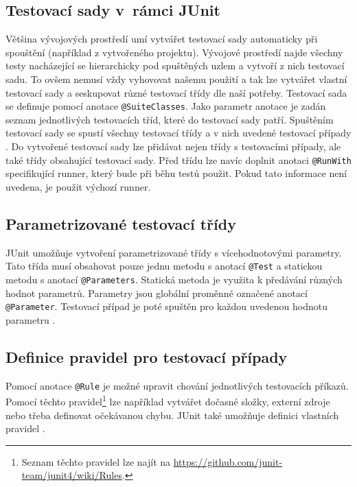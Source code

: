     \subsection{Testovací sady v~rámci JUnit}
    Většina vývojových prostředí umí vytvářet testovací sady automaticky při spouštění (například z vytvořeného projektu). Vývojové prostředí najde všechny testy nacházející se hierarchicky pod spuštěných uzlem a vytvoří z nich testovací sadu. To ovšem nemusí vždy vyhovovat našemu použití a tak lze vytvářet vlastní testovací sady a seskupovat různé testovací třídy dle naší potřeby. Testovací sada se definuje pomocí anotace \texttt{@SuiteClasses}. Jako parametr anotace je zadán seznam jednotlivých testovacích tříd, které do testovací sady patří. Spuštěním testovací sady se spustí všechny testovací třídy a v nich uvedené testovací případy \cite{vogella:JUnit}. Do vytvořené testovací sady lze přidávat nejen třídy s testovacími případy, ale také třídy obsahující testovací sady. Před třídu lze navíc doplnit anotaci \texttt{@RunWith} specifikující runner, který bude při běhu testů použit. Pokud tato informace není uvedena, je použit výchozí runner.

    \subsection{Parametrizované testovací třídy}
    JUnit umožňuje vytvoření parametrizované třídy s vícehodnotovými parametry. Tato třída musí obsahovat pouze jednu metodu s anotací \texttt{@Test} a statickou metodu s anotací \texttt{@Parameters}. Statická metoda je využita k předávání různých hodnot parametrů. Parametry jsou globální proměnné označené anotací \texttt{@Parameter}. Testovací případ je poté spuštěn pro každou uvedenou hodnotu parametru \cite{vogella:JUnit}.

    \subsection{Definice pravidel pro testovací případy}
    Pomocí anotace \texttt{@Rule} je možné upravit chování jednotlivých testovacích příkazů. Pomocí těchto pravidel\footnote{Seznam těchto pravidel lze najít na \url{https://github.com/junit-team/junit4/wiki/Rules}.} lze například vytvářet dočasné složky, externí zdroje nebo třeba definovat očekávanou chybu. JUnit také umožňuje definici vlastních pravidel \cite{vogella:JUnit}.

